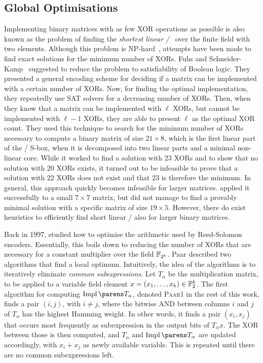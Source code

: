 \subsection{Global Optimisations}
\label{slps:subsec:xor2}
Implementing binary matrices with as few XOR operations as possible is also known as the problem of finding the \emph{shortest linear \SLP/}~\cite{SAT:FuhSch10,JC:BoyMatPer13} over the finite field with two elements.
Although this problem is NP-hard~\cite{MFCS:BoyMatPer08,JC:BoyMatPer13}, attempts have been made to find exact solutions for the minimum number of XORs.
Fuhs and Schneider-Kamp~\cite{IWIL:FuhSch10,SAT:FuhSch10} suggested to reduce the problem to satisfiability of Boolean logic.
They presented a general encoding scheme for deciding if a matrix can be implemented with a certain number of XORs.
Now, for finding the optimal implementation, they repeatedly use SAT solvers for a decreasing number of XORs.
Then, when they know that a matrix can be implemented with $\ell$ XORs, but cannot be implemented with $\ell - 1$ XORs, they are able to present $\ell$ as the optimal XOR count.
They used this technique to search for the minimum number of XORs necessary to compute a binary matrix of size $21 \times 8$, which is the first linear part of the \AES/ S-box, when it is decomposed into two linear parts and a minimal non-linear core.
While it worked to find a solution with 23 XORs and to show that no solution with 20 XORs exists, it turned out to be infeasible to prove that a solution with 22 XORs does not exist and that 23 is therefore the minimum.
In general, this approach quickly becomes infeasible for larger matrices.
\textcite{FSE:Stoffelen16} applied it successfully to a small $7 \times 7$ matrix, but did not manage to find a provably minimal solution with a specific matrix of size $19 \times 5$.
However, there do exist heuristics to efficiently find short linear \SLPp/ also for larger binary matrices.

Back in 1997, \textcite{ISIT:Paar97} studied how to optimise the arithmetic used by Reed-Solomon encoders.
Essentially, this boils down to reducing the number of XORs that are necessary for a constant multiplier over the field $\mathbb{F}_{2^k}$.
Paar described two algorithms that find a local optimum.
Intuitively, the idea of the algorithms is to iteratively eliminate \emph{common subexpressions}.
Let $T_{\alpha}$ be the multiplication matrix, to be applied to a variable field element $x = \left( x_1, \dotsc, x_k \right) \in \mathbb{F}_2^k$.
The first algorithm for computing $\impl{T_{\alpha}}$, denoted \textsc{Paar1} in the rest of this work, finds a pair $(i,j)$, with $i \neq j$, where the bitwise AND between columns $i$ and $j$ of $T_\alpha$ has the highest Hamming weight.
In other words, it finds a pair $(x_i, x_j)$ that occurs most frequently as subexpression in the output bits of $T_{\alpha}x$.
The XOR between those is then computed, and $T_{\alpha}$ and $\impl{T_{\alpha}}$ are updated accordingly, with $x_i + x_j$ as newly available variable.
This is repeated until there are no common subexpressions left.

